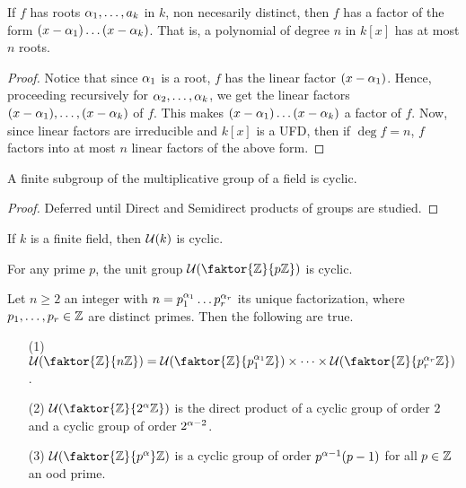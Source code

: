 \begin{theorem}\label{proposition_7.4.4}
  If $f$ has roots  $\alpha_1, \dots, a_k$ in $k$, non necesarily distinct, then
  $f$ has a factor of the form $(x-\alpha_1) \dots (x-\alpha_k)$. That is, a
  polynomial of degree $n$ in  $k[x]$ has at most $n$ roots.
\end{theorem}
\begin{proof}
  Notice that since $\alpha_1$ is a root, $f$ has the linear factor  $(x-\alpha_1)$.
  Hence, proceeding recursively for $\alpha_2, \dots, \alpha_k$, we get the linear
  factors $(x-\alpha_1), \dots, (x-\alpha_k)$ of $f$. This makes  $(x-\alpha_1) \dots
  (x-\alpha_k)$ a factor of $f$. Now, since linear factors are irreducible and
  $k[x]$ is a UFD, then if $\deg{f}=n$, $f$ factors into at most  $n$ linear
  factors of the above form.
\end{proof}

\begin{proposition}\label{proposition_7.4.5}
  A finite subgroup of the multiplicative group of a field is cyclic.
\end{proposition}
\begin{proof}
  Deferred until Direct and Semidirect products of groups are studied.
\end{proof}
\begin{corollary}
  If $k$ is a finite field, then  $\mathcal{U}(k)$ is cyclic.
\end{corollary}
\begin{corollary}
  For any prime $p$, the unit group  $\Uc(\faktor{\Z}{p\Z})$ is cyclic.
\end{corollary}
\begin{corollary}
  Let $n \geq 2$ an integer with  $n=p_1^{\alpha_1} \dots p_r^{\alpha_r}$ its unique
  factorization, where $p_1, \dots, p_r \in \mathbb{Z}$ are distinct primes. Then the
  following are true.
  \begin{enumerate}
    \item[(1)] $\Uc(\faktor{\Z}{n\Z})=\Uc(\faktor{\Z}{p_1^{\a_1}\Z}) \times
      \dots \times \Uc(\faktor{\Z}{p_r^{\a_r}\Z})$.

    \item[(2)] $\Uc(\faktor{\Z}{2^\a\Z})$ is the direct product of a cyclic
      group of order $2$ and a cyclic group of order $2^{\alpha-2}$.

    \item[(3)] $\Uc(\faktor{\Z}{p^\a}\Z)$ is a cyclic group of order
      $p^{\alpha-1}(p-1)$ for all $p \in \mathbb{Z}$ an ood prime.
  \end{enumerate}
\end{corollary}
